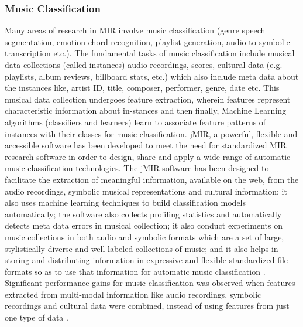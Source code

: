 \documentclass{proc}
\begin{document}
\subsubsection{Music Classification}
Many areas of research in MIR involve music classification (genre speech segmentation, emotion chord recognition, playlist generation, audio to symbolic transcription etc.). The fundamental tasks of music classification include musical data collections (called instances) audio recordings, scores, cultural data (e.g. playlists, album reviews, billboard stats, etc.) which also include meta data about the instances like, artist ID, title, composer, performer, genre, date etc. This musical data collection undergoes feature extraction, wherein features represent characteristic information about in-stances and then finally, Machine Learning algorithms (classifiers and learners) learn to associate feature patterns of instances with their classes for music classification.  jMIR, a powerful, flexible and accessible software has been developed to meet the need for standardized MIR research software in order to design, share and apply a wide range of automatic music classification technologies. The jMIR software has been designed to  facilitate  the extraction of meaningful information, available on the web, from the audio recordings, symbolic musical representations and cultural information; it also  uses machine learning techniques  to build classification models automatically; the software also collects profiling statistics and automatically detects meta data errors in musical collection; it also conduct experiments on music collections in both audio and symbolic formats which are a set of large, stylistically diverse and well labeled collections of music; and  it also helps in storing and distributing information in expressive and flexible standardized file formats so as to use that information for automatic music classification . Significant performance gains for music classification was observed when features extracted from multi-modal information like audio recordings, symbolic recordings and cultural data were combined, instead of using features from just one type of data \cite{mckay2010automatic}.
\end{document}
